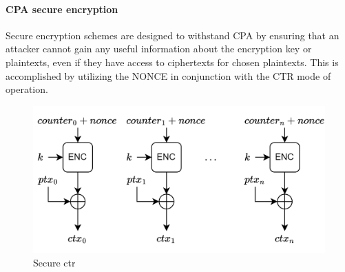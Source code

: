 \paragraph*{CPA secure encryption}
Secure encryption schemes are designed to withstand CPA by ensuring that an attacker cannot gain any useful information about the encryption key or plaintexts, even if they have access to ciphertexts for chosen plaintexts.
This is accomplished by utilizing the NONCE in conjunction with the CTR mode of operation.
\begin{figure}[H]
    \centering
    \includegraphics[width=0.75\linewidth]{images/sctr.png}
    \caption{Secure ctr}
\end{figure}